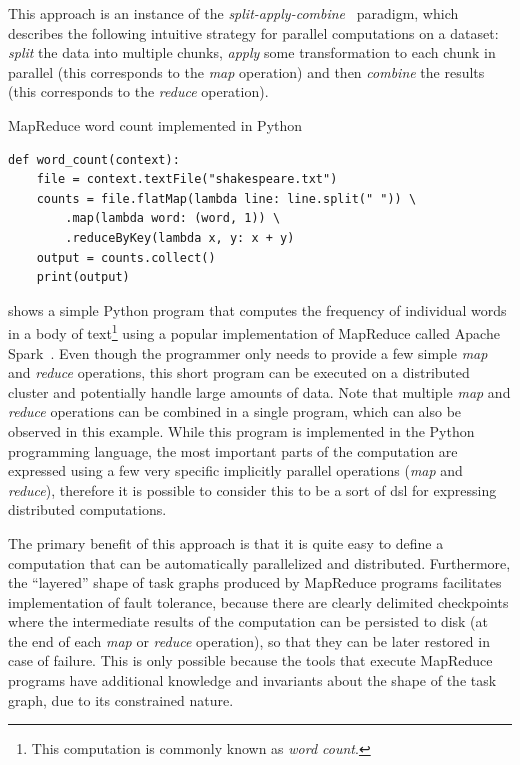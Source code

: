 This approach is an instance of the \emph{split-apply-combine}~\cite{split_apply_combine}
paradigm, which describes the following intuitive strategy for parallel computations on a dataset:
\emph{split} the data into multiple chunks, \emph{apply} some
transformation to each chunk in parallel (this corresponds to the \emph{map}
operation) and then \emph{combine} the results (this corresponds to the
\emph{reduce} operation).

\begin{listing}
	\caption{MapReduce word count implemented in Python}
	\label{lst:wordcount-example}
	\begin{verbatim}
def word_count(context):
	file = context.textFile("shakespeare.txt")
	counts = file.flatMap(lambda line: line.split(" ")) \
		.map(lambda word: (word, 1)) \
		.reduceByKey(lambda x, y: x + y)
	output = counts.collect()
	print(output)
	\end{verbatim}
\end{listing}

 shows a simple Python program that computes the frequency of
individual words in a body of text\footnote{This computation is commonly known as \emph{word count}.} using a popular implementation of
MapReduce called Apache Spark~\cite{spark}. Even though the programmer only needs to
provide a few simple \emph{map} and \emph{reduce} operations, this
short program can be executed on a distributed cluster and potentially handle large amounts of
data. Note that multiple \emph{map} and \emph{reduce} operations can
be combined in a single program, which can also be observed in this example. While this program is
implemented in the Python programming language, the most important parts of the computation are
expressed using a few very specific implicitly parallel operations (\emph{map} and
\emph{reduce}), therefore it is possible to consider this to be a sort of
\gls{dsl} for expressing distributed computations.

The primary benefit of this approach is that it is quite easy to define a computation that can be
automatically parallelized and distributed. Furthermore, the ``layered'' shape of task graphs
produced by MapReduce programs facilitates implementation of fault tolerance, because there are
clearly delimited checkpoints where the intermediate results of the computation can be persisted to
disk (at the end of each \emph{map} or \emph{reduce} operation), so
that they can be later restored in case of failure. This is only possible because the tools that
execute MapReduce programs have additional knowledge and invariants about the shape of the task
graph, due to its constrained nature.

